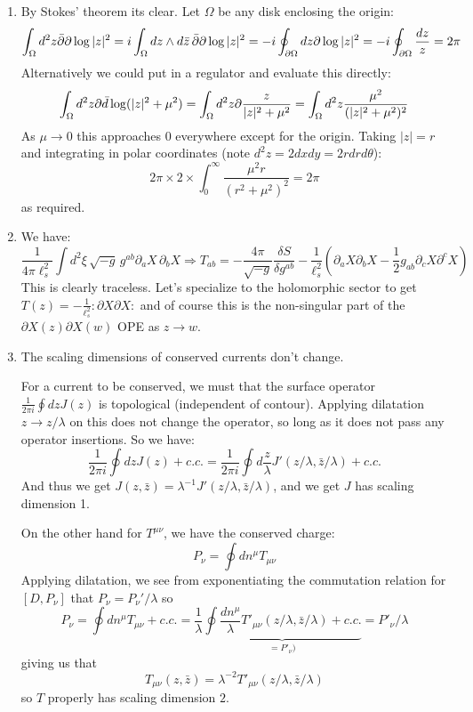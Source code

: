 \documentclass[11pt]{article}
\begin{document}
\begin{enumerate}
	\item By Stokes' theorem its clear. Let $\Omega$ be any disk enclosing the origin: 
	\[
		\int_{\Omega} d^2 z \bar {\partial} \partial \log |z|^2 =  i \int_{\Omega} dz \wedge d\bar z \,\bar {\partial} \partial \log|z|^2 = -i \oint_{\partial \Omega} dz \partial \log|z|^2 = - i \oint_{\partial \Omega} \frac{dz}{z} = 2\pi 
	\]
	Alternatively we could put in a regulator and evaluate this directly:
	\[
		\int_\Omega d^2 z \partial \bar d \log(|z|^2 + \mu^2) = \int_\Omega d^2 z \partial \frac{z}{|z|^2 + \mu^2} = \int_\Omega d^2 z \frac{\mu^2}{(|z|^2 + \mu^2)^2}
	\]
	As $\mu \to 0$ this approaches $0$ everywhere except for the origin. Taking $|z| = r$ and integrating in polar coordinates (note $d^2 z = 2 dx dy = 2 r dr d\theta$):
	\[
		2\pi \times 2 \times \int_{0}^\infty \frac{\mu^2 r}{(r^2 + \mu^2)^2} = 2 \pi
	\]
	as required.
	
	\item We have:
	\[
		\frac{1}{4 \pi \ell_s^2} \int d^2 \xi \, \sqrt{-g}\, g^{ab} \partial_a X\, \partial_b X \Rightarrow T_{ab} = -\frac{4\pi}{\sqrt{-g}} \frac{\delta S}{\delta g^{ab}} -\frac{1}{\ell_s^2} \left( \partial_a X \partial_b X - \frac12 g_{ab} \partial_c X \partial^c X \right)
	\]
	This is clearly traceless. Let's specialize to the holomorphic sector to get $T(z) = -\frac{1}{\ell_s^2} :\partial X \partial X:$ and of course this is the non-singular part of the $\partial X(z) \partial X(w)$ OPE as $z \to w$.
	
	
	\item The scaling dimensions of conserved currents don't change.
	
	For a current to be conserved, we must that the surface operator $\frac{1}{2\pi i} \oint dz J(z)$ is topological (independent of contour). Applying dilatation $z \to z/\lambda$ on this does not change the operator, so long as it does not pass any operator insertions. So we have:
	\[
		\frac{1}{2\pi i} \oint dz J(z) + c.c. = \frac{1}{2\pi i} \oint d\frac{z}{
		\lambda} J'(z/\lambda, \bar z/\lambda) + c.c.
	\]
	And thus we get $J(z, \bar z) = \lambda^{-1} J'(z/\lambda, \bar z/\lambda)$, and we get $J$ has scaling dimension 1.
	
	On the other hand for $T^{\mu \nu}$, we have the conserved charge:
	\[
		P_\nu = \oint dn^\mu T_{\mu \nu}
	\]
	Applying dilatation, we see from exponentiating the commutation relation for $[D, P_\nu]$ that $P_\nu = P_\nu'/\lambda$ so
	\[
		P_\nu = \oint dn^\mu T_{\mu \nu} + c.c. = \frac{1}{\lambda} \underbrace{\oint \frac{dn^\mu}{\lambda} T'_{\mu \nu}(z/\lambda, \bar z/\lambda) + c.c.}_{= P'_\nu)} = P'_\nu/\lambda
	\]
	giving us that
	\[
		T_{\mu \nu}(z, \bar z) = \lambda^{-2} T'_{\mu \nu}(z/\lambda, \bar z/\lambda)
	\]
	so $T$ properly has scaling dimension $2$.
	

\end{enumerate}
\end{document}
